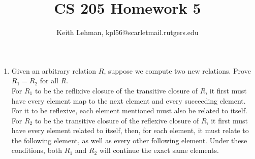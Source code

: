 \documentclass{article}
\title{CS 205 Homework 5}
\author{Keith Lehman, kpl56@scarletmail.rutgers.edu}
\begin{document}
\maketitle

\begin{enumerate}

\item Given an arbitrary relation $R$, suppose we compute two new relations. Prove $R_{1} = R_{2}$ for all $R$. \\
For $R_{1}$ to be the reflixive closure of the transitive closure of $R$, it first must have every element map to the next element and every succeeding element. For it to be reflexive, each element mentioned must also be related to itself. For $R_{2}$ to be the transitive closure of the reflexive closure of $R$, it first must have every element related to itself, then, for each element, it must relate to the following element, as well as every other following element. Under these conditions, both $R_{1}$ and $R_{2}$ will continue the exact same elements. 


\end{enumerate}
\end{document}
